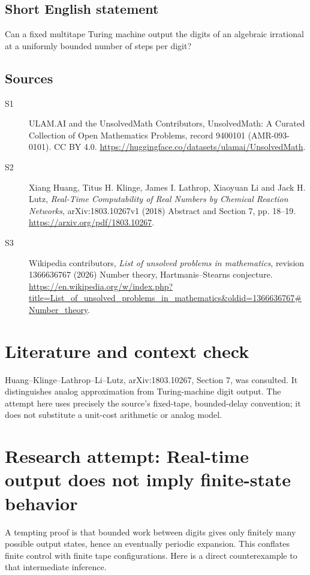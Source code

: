 \documentclass[11pt]{article}
\begin{document}
\subsection{Short English statement}
Can a fixed multitape Turing machine output the digits of an algebraic irrational at a uniformly bounded number of steps per digit?
\subsection{Sources}
\begin{description}
\item[S1] ULAM.AI and the UnsolvedMath Contributors, UnsolvedMath: A Curated Collection of Open Mathematics Problems, record 9400101 (AMR-093-0101). CC BY 4.0. \url{https://huggingface.co/datasets/ulamai/UnsolvedMath}.
\item[S2] Xiang Huang, Titus H. Klinge, James I. Lathrop, Xiaoyuan Li and Jack H. Lutz, \emph{Real-Time Computability of Real Numbers by Chemical Reaction Networks}, arXiv:1803.10267v1 (2018) Abstract and Section 7, pp. 18--19. \url{https://arxiv.org/pdf/1803.10267}.
\item[S3] Wikipedia contributors, \emph{List of unsolved problems in mathematics}, revision 1366636767 (2026) Number theory, Hartmanis–Stearns conjecture. \url{https://en.wikipedia.org/w/index.php?title=List_of_unsolved_problems_in_mathematics&oldid=1366636767#Number_theory}.
\end{description}
\label{end:9400101}

\section{Literature and context check}
Huang--Klinge--Lathrop--Li--Lutz, arXiv:1803.10267, Section 7, was consulted.
It distinguishes analog approximation from Turing-machine digit output. The
attempt here uses precisely the source's fixed-tape, bounded-delay convention;
it does not substitute a unit-cost arithmetic or analog model.
\section{Research attempt: Real-time output does not imply finite-state behavior}
A tempting proof is that bounded work between digits gives only finitely many
possible output states, hence an eventually periodic expansion. This conflates
finite control with finite tape configurations. Here is a direct counterexample
to that intermediate inference.
\end{document}
